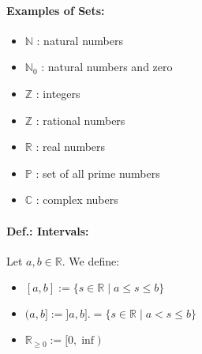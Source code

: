 \documentclass[twocolumn]{article}
\begin{document}
			\paragraph{Examples of Sets:}
				\begin{itemize}%
				\renewcommand{\labelitemi}{$\rightarrow$}
				\item $\mathbb N$ : natural numbers
				\item $\mathbb N_0$ : natural numbers and zero
				\item $\mathbb Z$ : integers
				\item $\mathbb Z$ : rational numbers
				\item $\mathbb R$ : real numbers 
				\item $\mathbb P$ : set of all prime numbers
				\item $\mathbb C$ : complex nubers
				\end{itemize}
			
			\paragraph{Def.: Intervals:}
				Let $a,b\in\mathbb R$. We define:
				\begin{itemize}%
				\renewcommand{\labelitemi}{$\rightarrow$}
				\item $[a,b]:=\{s\in\mathbb R\mid a\le s\le b\}$
				\item $(a,b]:=]a,b].=\{s\in\mathbb R\mid a<s\le b\}$ 
				\item $\mathbb R_{\ge0}:=[0,\inf)$
				\end{itemize}
\end{document}
